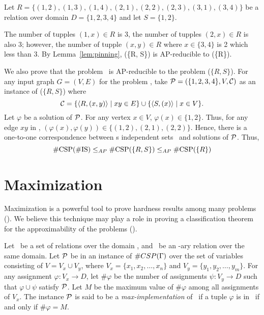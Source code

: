 \begin{example}
Let \(R=\{(1,2), (1,3), (1,4), (2,1), (2,2), (2,3), (3,1), (3,4)\}\) be a relation
over domain \(D=\{1,2,3,4\}\) and  let \(S=\{1,2\}\)\@.

The number of tupples \((1,x)\in R\) is 3, the number of tupples \((2,x) \in R\) 
is also 3; however, the number of tupple \((x,y)\in R\) where \(x\in\{3,4\}\) is 2
which less than 3\@. By Lemma~\ref{lem:pinning}, \ccsp(\{R, S\}) is AP-reducible to
\ccsp(\{R\})\@.

We also prove that the problem \cisp\ is AP-reducible to the problem \ccsp(\(\{R,S\}\)).
For any input graph \(G=(V,E)\) for the problem \cisp, take
\(\mathcal{P} = (\{1,2,3,4\}, V, \mathcal{C})\) as an instance of \ccsp(\(\{R,S\}\)) where
\[\mathcal{C} = \{\langle R, (x,y) \rangle\mid xy \in E\} \cup \{\langle S, (x) \rangle \mid x \in V\}.\]
Let \(\varphi\) be a solution of \(\mathcal{P}\)\@. For any vertex \(x \in V\), \(\varphi(x)\in \{1,2\}\)\@. Thus, for any edge \(xy\) in \mG, \((\varphi(x),\varphi(y))\in 
 \{(1,2),(2,1),(2,2)\}\). Hence, there is a one-to-one correspondence between s independent sets
 \mG\ and solutions of \(\mathcal{P}\)\@. Thus,
 \[\mathrm{\#CSP(\#IS)} \le_{AP} \mathrm{\#CSP(}\{R,S\}\mathrm{)} \le_{AP} \mathrm{\#CSP(}
 \{R\}\mathrm{)}\]
\end{example}

\section{Maximization}
Maximization is a powerful tool to prove hardness results among many problems \ccsp(\mrelset)\@.
We believe this technique may play a role in proving a classification theorem for the approximability of the problems \ccsp(\mrelset)\@.

\begin{defi}\label{def:max}
Let \mrelset\ be a set of relations over the domain \mD,
and \mR\ be an \mn-ary relation over the same domain. 
Let \(\mathcal{P}\) be in an instance of \(\#CSP(\Gamma)\) over the
set of variables consisting of \(V=V_x \cup V_y\), where \(V_x = \{x_1,x_2,\dots,x_n\}\)
and \(V_y=\{y_1,y_2,\dotsc,y_m\}\)\@. For any assignment \(\varphi: V_x\to D\),
let \(\#\varphi\) be the number of assignments \(\psi:V_y\to D\) such
that \(\varphi \cup \psi\) satisfy \(\mathcal{P}\)\@. Let \(M\) be the maximum value of \(\#\varphi\)
among all assignments of \(V_x\)\@. The instance \(\mathcal{P}\) is said to be a \emph{max-implementation}
of \mR\ if a tuple \(\varphi\) is in \mR\ if and only if \(\#\varphi = M\)\@.
\end{defi} 

